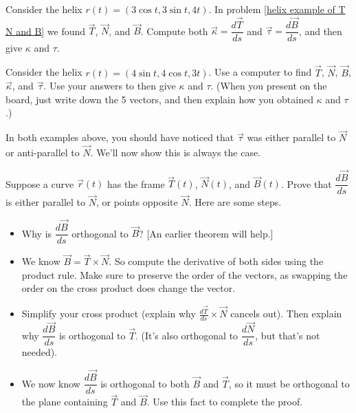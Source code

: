 \begin{problem}
%
Consider the helix $r(t)=(3\cos t, 3\sin t, 4t)$. In problem \ref{helix example of T N and B} we found $\vec T$, $\vec N$, and $\vec B$. Compute both $\vec \kappa=\dfrac{d\vec T}{ds}$ and $\vec \tau=\dfrac{d\vec B}{ds}$, and then give $\kappa$ and $\tau$.
\end{problem}

\begin{problem}
 Consider the helix $r(t)=(4\sin t, 4\cos t, 3t)$. Use a computer to find $\vec T$, $\vec N$, $\vec B$, $\vec \kappa$, and $\vec \tau$. Use your answers to then give $\kappa$ and $\tau$. (When you present on the board, just write down the 5 vectors, and then explain how you obtained $\kappa$ and $\tau$.)
\end{problem}

In both examples above, you should have noticed that $\vec \tau$ was either parallel to $\vec N$ or anti-parallel to $\vec N$.  We'll now show this is always the case.

\begin{problem}%
 Suppose a curve $\vec r(t)$ has the frame $\vec T(t)$, $\vec N(t)$, and $\vec B(t)$. Prove that $\dfrac{d\vec B}{ds}$ is either parallel to $\vec N$, or points opposite $\vec N$. Here are some steps.
 \begin{itemize}
  \item Why is $\dfrac{d\vec B}{ds}$ orthogonal to $\vec B$? [An earlier theorem will help.]
  \item We know $\vec B=\vec T\times \vec N$. So compute the derivative of both sides using the product rule. Make sure to preserve the order of the vectors, as swapping the order on the cross product does change the vector.  
  \item Simplify your cross product (explain why $\frac{d\vec T}{ds}\times \vec N$ cancels out). Then explain why $\dfrac{d\vec B}{ds}$ is orthogonal to $\vec T$. (It's also orthogonal to $\dfrac{d\vec N}{ds}$, but that's not needed).
  \item We now know $\dfrac{d\vec B}{ds}$ is orthogonal to both $\vec B$ and $\vec T$, so it must be orthogonal to the plane containing $\vec T$ and $\vec B$. Use this fact to complete the proof.
 \end{itemize}
\end{problem}


